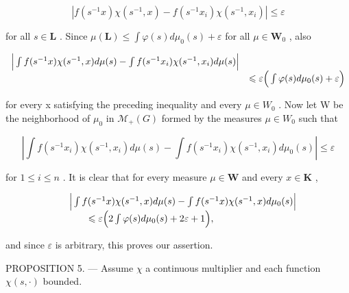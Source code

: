 \[
\left| f (s ^ {- 1} x) \chi (s ^ {- 1}, x) - f (s ^ {- 1} x _ {i}) \chi (s ^ {- 1}, x _ {i}) \right| \leqslant \varepsilon
\]

for all \(s \in \mathbf{L}\) . Since \(\mu(\mathbf{L}) \leqslant \int \varphi(s) d\mu_0(s) + \varepsilon\) for all \(\mu \in \mathbf{W}_0\) , also

\[
\begin{array}{r l} \Big | \int f (s ^ {- 1} x) \chi (s ^ {- 1}, x) d \mu (s) - \int f (s ^ {- 1} x _ {i}) \chi (s ^ {- 1}, x _ {i}) d \mu (s) \Big | & \\ & \leqslant \varepsilon \Big (\int \varphi (s) d \mu_ {0} (s) + \varepsilon \Big) \end{array}
\]

for every x satisfying the preceding inequality and every \(\mu \in W_{0}\) . Now let W be the neighborhood of \(\mu_{0}\) in \(\mathcal{M}_{+}(G)\) formed by the measures \(\mu \in W_{0}\) such that

\[
\left| \int f (s ^ {- 1} x _ {i}) \chi (s ^ {- 1}, x _ {i}) d \mu (s) - \int f (s ^ {- 1} x _ {i}) \chi (s ^ {- 1}, x _ {i}) d \mu_ {0} (s) \right| \leqslant \varepsilon
\]

for \(1 \leqslant i \leqslant n\) . It is clear that for every measure \(\mu \in \mathbf{W}\) and every \(x \in \mathbf{K}\) ,

\[
\begin{array}{r l} & {\Big | \int f (s ^ {- 1} x) \chi (s ^ {- 1}, x) d \mu (s) - \int f (s ^ {- 1} x) \chi (s ^ {- 1}, x) d \mu_ {0} (s) \Big |} \\ & {\qquad \leqslant \varepsilon \Big (2 \int \varphi (s) d \mu_ {0} (s) + 2 \varepsilon + 1 \Big),} \end{array}
\]

and since \(\varepsilon\) is arbitrary, this proves our assertion.

PROPOSITION 5. --- Assume \(\chi\) a continuous multiplier and each function \(\chi(s,\cdot)\) bounded.

